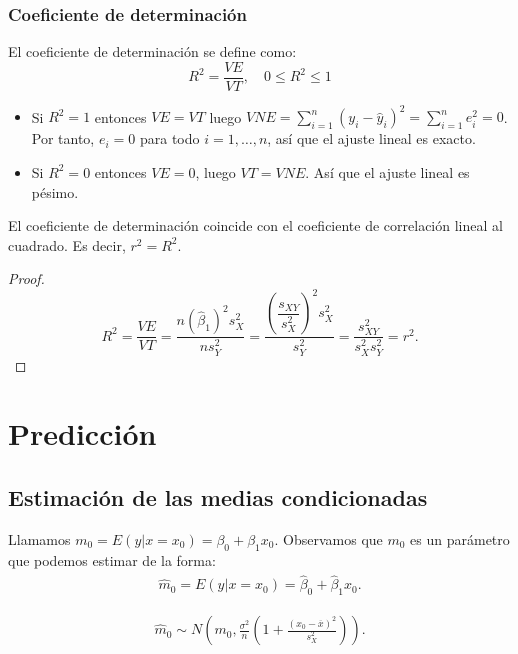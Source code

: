 \subsubsection{Coeficiente de determinación}
\noindent El coeficiente de determinación se define como:
$$R^2 = \frac{VE}{VT}, \quad 0 \leq R^2 \leq 1$$
\begin{itemize}
    \item Si $R^2 = 1$ entonces $VE = VT$ luego $VNE = \sum_{i=1}^n (y_i - \widehat{y}_i)^2 = \sum_{i=1}^n e_i^2 = 0$.
          Por tanto, $e_i = 0$ para todo $i = 1, \dots, n$, así que el ajuste lineal es exacto.
    \item Si $R^2 = 0$ entonces $VE = 0$, luego $VT = VNE$.
          Así que el ajuste lineal es pésimo.
\end{itemize}

\begin{teo}
    El coeficiente de determinación coincide con el coeficiente de correlación lineal al cuadrado. Es decir, $r^2 = R^2$.
\end{teo}

\begin{proof}
    $$R^2 = \frac{VE}{VT} = \frac{n(\widehat{\beta}_1)^2s_X^2}{ns_Y^2} = \frac{\left(\dfrac{s_{XY}}{s_X^2}\right)^2 s_X^2}{s_Y^2} = \frac{s_{XY}^2}{s_X^2 s_Y^2} = r^2.$$
\end{proof}

\section{Predicción}

\subsection{Estimación de las medias condicionadas}
\noindent Llamamos $m_0 = E(y | x=x_0) = \beta_0 + \beta_1x_0$.
Observamos que $m_0$ es un parámetro que podemos estimar de la forma:
\begin{align*}
    \widehat{m}_0 = \widehat{E(y | x=x_0)} = \widehat{\beta}_0 + \widehat{\beta}_1x_0.
\end{align*}

\begin{teo}
    \begin{align*}
        \widehat{m}_0 \sim N\left( m_0, \frac{\sigma^2}{n} \left(1+\frac{(x_0-\overline{x})^2}{s_X^2}\right) \right).
    \end{align*}
\end{teo}

